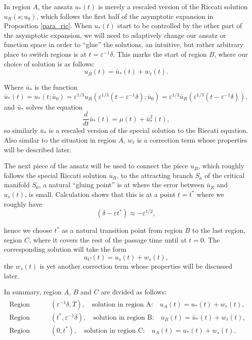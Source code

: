 \documentclass[letterpaper,11pt]{article}
\newcommand{\eps}{\varepsilon}
\numberwithin{equation}{section}
\theoremstyle{plain}
\begin{document}
In region $A$, the ansatz $u_*(t)$ is merely a rescaled version of the Riccati solution $u_R(s; u_0)$, which follows the first half of the asymptotic expansion in Proposition \ref{para_ric}. When $u_*(t)$ start to be controlled by the other part of the asymptotic expansion, we will need to adaptively change our ansatz or function space in order to ``glue'' the solutions, an intuitive, but rather arbitrary place to switch regions is at $t = \eps^{-1} \delta$. This marks the start of region $B$, where our choice of solution is as follows:
 \[ 
 u_B(t) = \bar{u}_*(t)  +w_\ell(t).
\]

Where $\bar{u}_*$ is the function
\begin{equation}\label{uldef}
\bar{u}_*(t) = u_*(t;\bar{u}_0) = \eps^{1/3} u_R( \eps^{1/3}(t-\eps^{-1}\delta); \bar{u}_0)=\eps^{1/3}\bar{u}_R(\eps^{1/3}(t-\eps^{-1}\delta)),
\end{equation}
and $\bar{u}_*$ solves the equation
\begin{equation}\label{uleq}
\frac{d}{dt}\bar{u}_* (t) = \mu(t) + \bar{u}_*^2(t),
\end{equation}
so similarly $\bar{u}_*$ is a rescaled version of the special solution to the Riccati equation. Also similar to the situation in region $A$, $w_\ell$ is a correction term whose properties will be described later.

The next piece of the ansatz will be used to connect the piece $u_B$, which roughly follows the special Riccati solution $\bar{u}_R$, to the attracting branch $S_a$ of the critical manifold $S_0$, a natural ``gluing point'' is at where the error between $\bar{u}_R$ and $u_s(t)$, is small. Calculation shows that this is at a point $t=t^*$ where we roughly have
\begin{equation}
(\delta - \eps t^*) \approx -\eps^{1/2},
\end{equation} 

hence we choose $t^*$ as a natural transition point from region $B$ to the last region, region $C$, where it covers the rest of the passage time until at $t=0$. The corresponding solution will take the form
\[
u_C(t) = u_s(t) + w_s(t),
\]
the $w_s(t)$ is yet another correction term whose properties will be discussed later. 

In summary, region $A$, $B$ and $C$ are divided as follows:
\begin{align}\label{region_division_t}
\begin{split}
\text{Region A:} & \quad (\eps^{-1}\delta, T), \quad \text{solution in region A:} \quad u_A(t) = u_*(t)+w_r(t), \\
\text{Region B:} & \quad (t^*, \eps^{-1}\delta), \quad \text{solution in region B:} \quad u_B(t) = \bar{u}_*(t)+w_\ell(t),  \\
\text{Region C:} & \quad (0, t^*), \quad \text{solution in region C:} \quad u_A(t) = u_*(t)+w_s(t).
\end{split}
\end{align}
\end{document}
